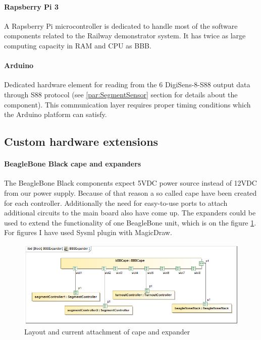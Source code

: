 \paragraph{Rapsberry Pi 3}
A Rapsberry Pi microcontroller is dedicated to handle most of the software components related to the Railway demonstrator system. It has twice as large computing capacity in RAM and CPU as BBB.

\paragraph{Arduino}
Dedicated hardware element for reading from the 6 DigiSens-8-S88 output data through S88 protocol (see \ref{par:SegmentSensor} section for details about the component). This communication layer requires proper timing conditions which the Arduino platform can satisfy.

\subsection{Custom hardware extensions}
\paragraph{BeagleBone Black cape and expanders}\label{par:BBBcape}
The BeagleBone Black components expect 5VDC power source instead of 12VDC from our power supply. Because of that reason a so called cape have been created for each controller. Additionally the need for easy-to-use ports to attach additional circuits to the main board also have come up. The expanders could be used to extend the functionality of one BeagleBone unit, which is on the figure \ref{fig:capeSysml}. For figures I have used Sysml plugin with MagicDraw. \cite{SysML}

\begin{figure}[!h]
	\centering
	\includegraphics[width=150mm]{figures/modes3/BBBExpander.png}
	\caption{Layout and current attachment of cape and expander}
	\label{fig:capeSysml}
\end{figure}

